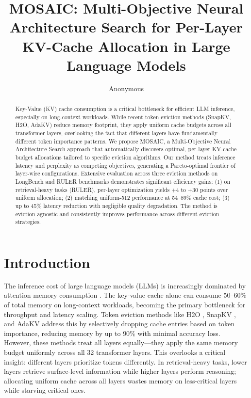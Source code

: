 \documentclass[11pt]{article}
\title{MOSAIC: Multi-Objective Neural Architecture Search for Per-Layer KV-Cache Allocation in Large Language Models}
\author{Anonymous}
\begin{document}
\maketitle
\begin{abstract}
Key-Value (KV) cache consumption is a critical bottleneck for efficient LLM inference, especially on long-context workloads. While recent token eviction methods (SnapKV, H2O, AdaKV) reduce memory footprint, they apply uniform cache budgets across all transformer layers, overlooking the fact that different layers have fundamentally different token importance patterns. We propose MOSAIC, a Multi-Objective Neural Architecture Search approach that automatically discovers optimal, per-layer KV-cache budget allocations tailored to specific eviction algorithms. Our method treats inference latency and perplexity as competing objectives, generating a Pareto-optimal frontier of layer-wise configurations. Extensive evaluation across three eviction methods on LongBench and RULER benchmarks demonstrates significant efficiency gains: (1) on retrieval-heavy tasks (RULER), per-layer optimization yields +4 to +30 points over uniform allocation; (2) matching uniform-512 performance at 54–89\% cache cost; (3) up to 45\% latency reduction with negligible quality degradation. The method is eviction-agnostic and consistently improves performance across different eviction strategies.
\end{abstract}

\section{Introduction}

The inference cost of large language models (LLMs) is increasingly dominated by attention memory consumption \citep{dao2023flashattention,kiseroglou2024attention}. The key-value cache alone can consume 50–60\% of total memory on long-context workloads, becoming the primary bottleneck for throughput and latency scaling. Token eviction methods like H2O \citep{zhang2024h2o}, SnapKV \citep{li2024snapkv}, and AdaKV \citep{wei2024adakv} address this by selectively dropping cache entries based on token importance, reducing memory by up to 90\% with minimal accuracy loss. However, these methods treat all layers equally—they apply the same memory budget uniformly across all 32 transformer layers. This overlooks a critical insight: different layers prioritize tokens differently. In retrieval-heavy tasks, lower layers retrieve surface-level information while higher layers perform reasoning; allocating uniform cache across all layers wastes memory on less-critical layers while starving critical ones.
\end{document}
